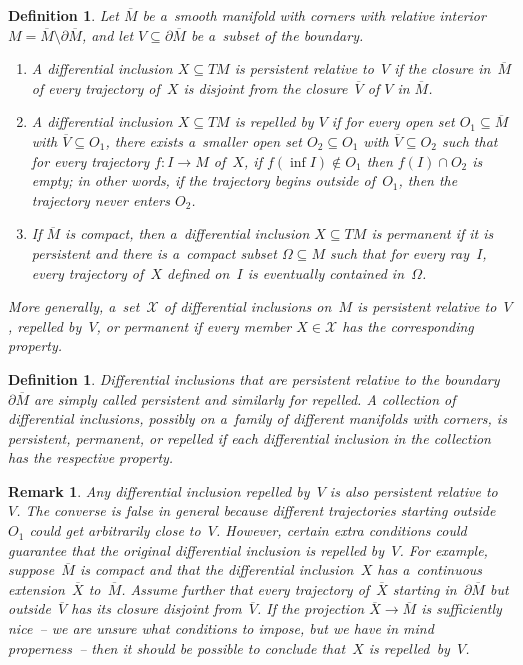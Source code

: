 \documentclass[11pt]{article}
\newtheorem{Definition}[Theorem]{Definition}
\newtheorem{Remark}[Theorem]{Remark}
\newcommand\ol[1]{{\overline {#1}}}
\begin{document}
\begin{Definition}
\label{d:persistent}
Let $\ol{M}$ be a~smooth manifold with corners with relative interior $M=\ol M\setminus\partial\ol M$, and let
$V\subseteq\partial\ol M$ be a~subset of the boundary.
\begin{enumerate}\itemsep=0pt
\item A dif\/ferential inclusion $X\subseteq TM$ is \emph{persistent relative to~$V$} if the closure in~$\ol M$ of
every trajectory of~$X$ is disjoint from the closure~$\ol V$ of $V$ in $\ol M$.

\item A dif\/ferential inclusion $X\subseteq TM$ is \emph{repelled by $V$} if for every open set $O_1\subseteq\ol M$
with $\ol V\subseteq O_1$, there exists a~smaller open set $O_2\subseteq O_1$ with $\ol V\subseteq O_2$ such that for
every trajectory $f:I\to M$ of~$X$, if $f(\inf{I})\notin O_1$ then $f(I)\cap O_2$ is empty; in other words, if the
trajectory begins outside of~$O_1$, then the trajectory never enters $O_2$.

\item If $\ol M$ is compact, then a~dif\/ferential inclusion $X\subseteq TM$ is \emph{permanent} if it is persistent
and there is a~compact subset $\Omega\subseteq M$ such that for every ray~$I$, every trajectory of~$X$ def\/ined on~$I$
is eventually contained in~$\Omega$.
\end{enumerate}
More generally, a~set~$\mathcal X$ of dif\/ferential inclusions on~$M$ is \emph{persistent relative to~$V$},
\emph{repelled by~$V$}, or \emph{permanent} if every member $X\in\mathcal X$ has the corresponding property.
\end{Definition}
\begin{Definition}\label{d:persistent'}
Dif\/ferential inclusions that are persistent relative to the boundary $\partial\ol M$ are simply called
\emph{persistent} and similarly for \emph{repelled}.
A collection of dif\/ferential inclusions, possibly on a~family of dif\/ferent manifolds with corners, is
\emph{persistent}, \emph{permanent}, or \emph{repelled} if each dif\/ferential inclusion in the collection has the
respective property.
\end{Definition}
\begin{Remark}\label{r:repelled==>persistent}
Any dif\/ferential inclusion repelled by~$V$ is also persistent relative to~$V$.
The converse is false in general because dif\/ferent trajectories starting outside $O_1$ could get arbitrarily close
to~$V$.
However, certain extra conditions could guarantee that the original dif\/ferential inclusion is repelled by~$V$.
For example, suppose~$\ol M$ is compact and that the dif\/ferential inclusion~$X$ has a~continuous extension~$\ol X$
to~$\ol M$.
Assume further that every trajectory of~$\ol X$ starting in~$\partial\ol M$ but outside~$\ol V$ has its closure
disjoint from~$\ol V$.
If the projection $\ol X\to\ol M$ is suf\/f\/iciently nice~-- we are unsure what conditions to impose, but we have in
mind properness~-- then it should be possible to conclude that~$X$ is repelled~by~$V$.
\end{Remark}
\end{document}
